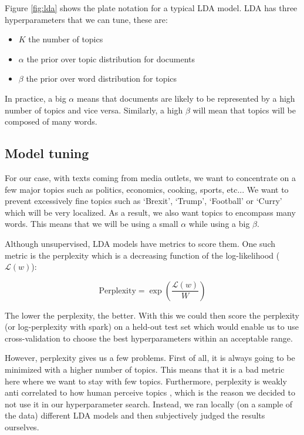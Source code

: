 \documentclass[11pt]{article}
\begin{document}
Figure \ref{fig:lda} shows the plate notation for a typical LDA model. LDA has three hyperparameters that we can tune, these are:
\begin{itemize}
    \item $K$ the number of topics
    \item $\alpha$ the prior over topic distribution for documents
    \item $\beta$ the prior over word distribution for topics
\end{itemize}

In practice, a big $\alpha$ means that documents are likely to be represented by a high number of topics and vice versa. Similarly, a high $\beta$ will mean that topics will be composed of many words. 

\subsection{Model tuning}
For our case, with texts coming from media outlets, we want to concentrate on a few major topics such as politics, economics, cooking, sports, etc... We want to prevent excessively fine topics such as `Brexit', `Trump', `Football' or `Curry' which will be very localized. As a result, we also want topics to encompass many words. This means that we will be using a small $\alpha$ while using a big $\beta$.

Although unsupervised, LDA models have metrics to score them. One such metric is the perplexity which is a decreasing function of the log-likelihood ($\mathcal{L}(w)$):

\begin{equation*}
    \textrm{Perplexity} = \exp\left(\frac{\mathcal{L}(w)}{W}\right)
\end{equation*}

The lower the perplexity, the better. With this we could then score the perplexity (or log-perplexity with spark) on a held-out test set which would enable us to use cross-validation to choose the best hyperparameters within an acceptable range. 

However, perplexity gives us a few problems. First of all, it is always going to be minimized with a higher number of topics. This means that it is a bad metric here where we want to stay with few topics. Furthermore, perplexity is weakly anti correlated to how human perceive topics \autocite{Cha:09}, which is the reason we decided to not use it in our hyperparameter search. Instead, we ran locally (on a sample of the data) different LDA models and then subjectively judged the results ourselves.
\end{document}
